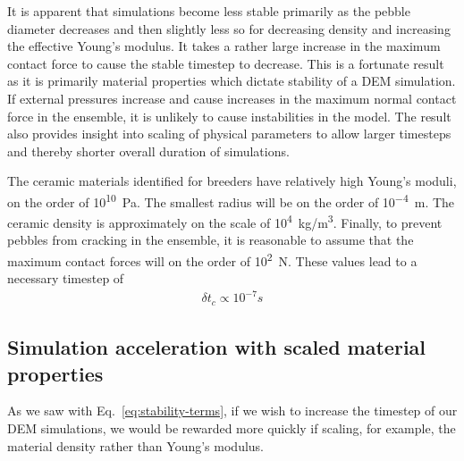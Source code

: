 It is apparent that simulations become less stable primarily as the pebble diameter decreases and then slightly less so for decreasing density and increasing the effective Young's modulus. It takes a rather large increase in the maximum contact force to cause the stable timestep to decrease. This is a fortunate result as it is primarily material properties which dictate stability of a DEM simulation. If external pressures increase and cause increases in the maximum normal contact force in the ensemble, it is unlikely to cause instabilities in the model. The result also provides insight into scaling of physical parameters to allow larger timesteps and thereby shorter overall duration of simulations.

The ceramic materials identified for breeders have relatively high Young's moduli, on the order of \si{10^{10} Pa}. The smallest radius will be on the order of \si{10^{-4} m}. The ceramic density is approximately on the scale of \si{10^{4} kg/m^3}. Finally, to prevent pebbles from cracking in the ensemble, it is reasonable to assume that the maximum contact forces will on the order of \si{10^2 N}. These values lead to a necessary timestep of
\begin{align}
\delta t_c \propto 10^{-7} \si{s}
\end{align}



\subsection{Simulation acceleration with scaled material properties}
As we saw with Eq.~\ref{eq:stability-terms}, if we wish to increase the timestep of our DEM simulations, we would be rewarded more quickly if scaling, for example, the material density rather than Young's modulus.


